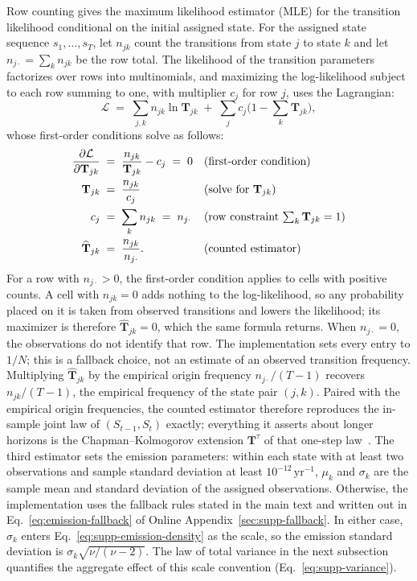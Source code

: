 Row counting gives the maximum likelihood estimator (MLE) for the transition likelihood conditional on the initial assigned state. For the assigned state sequence
$s_1, \dots, s_T$, let $n_{jk}$ count the transitions from state $j$
to state $k$ and let $n_{j \cdot} = \sum_k n_{jk}$ be the row total.
The likelihood of the transition parameters factorizes over rows into
multinomials, and maximizing the log-likelihood subject to each row
summing to one, with multiplier $c_j$ for row $j$, uses the
Lagrangian:
\begin{equation}
  \mathcal{L} \;=\; \sum_{j, k} n_{jk} \ln \mathbf{T}_{jk}
    \;+\; \sum_{j} c_{j} \Big(1 - \sum_{k} \mathbf{T}_{jk}\Big),
  \label{eq:supp-lagrangian}
\end{equation}
whose first-order conditions solve as follows:
\begin{align}
  \frac{\partial \mathcal{L}}{\partial \mathbf{T}_{jk}}
   &\;=\; \frac{n_{jk}}{\mathbf{T}_{jk}} - c_j \;=\; 0
     && \text{(first-order condition)} \notag \\
  \mathbf{T}_{jk}
   &\;=\; \frac{n_{jk}}{c_j}
     && \text{(solve for $\mathbf{T}_{jk}$)} \notag \\
  c_j
   &\;=\; \sum_{k} n_{jk} \;=\; n_{j \cdot}
     && \text{(row constraint $\textstyle\sum_k \mathbf{T}_{jk} = 1$)} \notag \\
  \widehat{\mathbf{T}}_{jk}
   &\;=\; \frac{n_{jk}}{n_{j \cdot}}.
     && \text{(counted estimator)}
  \label{eq:supp-markov-mle}
\end{align}
For a row with $n_{j\cdot}>0$, the first-order condition applies to
cells with positive counts. A cell with $n_{jk}=0$ adds nothing to the
log-likelihood, so any probability placed on it is taken from observed
transitions and lowers the likelihood; its maximizer is therefore
$\widehat{\mathbf{T}}_{jk}=0$, which the same formula returns.
When $n_{j\cdot}=0$, the observations do not identify that row.
The implementation sets every entry to $1/N$; this is a fallback
choice, not an estimate of an observed transition frequency.
Multiplying $\widehat{\mathbf{T}}_{jk}$ by the empirical origin
frequency $n_{j\cdot}/(T-1)$ recovers $n_{jk}/(T-1)$, the empirical
frequency of the state pair $(j, k)$. Paired with the empirical
origin frequencies, the counted estimator therefore reproduces the
in-sample joint law of $(S_{t-1}, S_t)$ exactly; everything it
asserts about longer horizons is the Chapman--Kolmogorov extension
$\mathbf{T}^\tau$ of that one-step law~\cite{bilmes1998,
grinsteadSnell1997}. The third estimator sets the emission parameters:
within each state with at least two observations and sample standard
deviation at least $10^{-12}\,\mathrm{yr}^{-1}$, $\mu_k$ and
$\sigma_k$ are the sample mean and standard deviation of the assigned
observations. Otherwise, the implementation uses the fallback rules
stated in the main text and written out in
Eq.~\eqref{eq:emission-fallback} of Online
Appendix~\ref{sec:supp-fallback}. In either case, $\sigma_k$ enters
Eq.~\eqref{eq:supp-emission-density} as the scale, so the emission
standard deviation is $\sigma_k \sqrt{\nu/(\nu - 2)}$. The law of
total variance in the next subsection quantifies the aggregate effect
of this scale convention (Eq.~\eqref{eq:supp-variance}).

